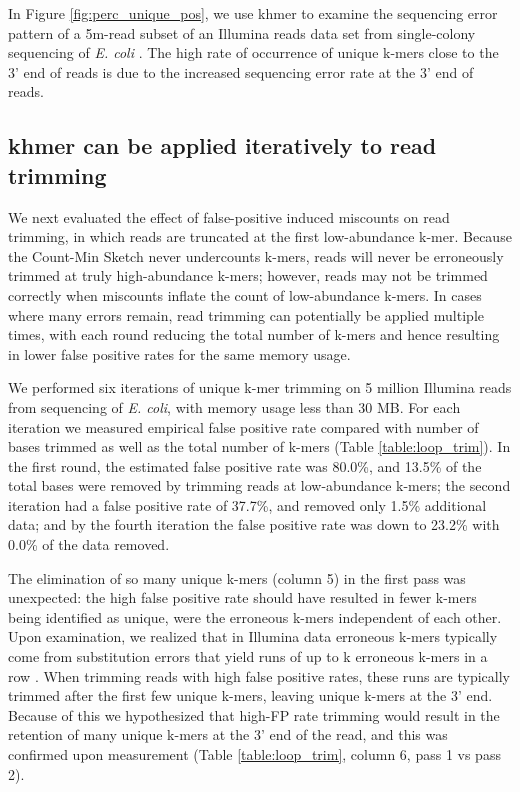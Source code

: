 \documentclass[10pt]{article}
\begin{document}
In Figure \ref{fig:perc_unique_pos}, we use khmer to examine the
sequencing error pattern of a 5m-read subset of an Illumina reads data
set from single-colony sequencing of {\em E. coli}
\cite{pubmed21926975}.  The high rate of occurrence of unique k-mers
close to the 3' end of reads is due to the increased sequencing error
rate at the 3' end of reads.

\subsection*{khmer can be applied iteratively to read trimming}

We next evaluated the effect of false-positive induced miscounts on
read trimming, in which reads are truncated at the first low-abundance
k-mer.  Because the Count-Min Sketch never undercounts k-mers, reads
will never be erroneously trimmed at truly high-abundance k-mers;
however, reads may not be trimmed correctly when miscounts inflate the
count of low-abundance k-mers.  In cases where many errors remain,
read trimming can potentially be applied multiple times, with each
round reducing the total number of k-mers and hence resulting in lower
false positive rates for the same memory usage.

We performed six iterations of unique k-mer trimming on 5 million
Illumina reads from sequencing of {\em E. coli}, with memory
usage less than 30 MB.  For each iteration we measured empirical false
positive rate compared with number of bases trimmed as well as the
total number of k-mers (Table \ref{table:loop_trim}).  In the first
round, the estimated false positive rate was 80.0\%, and 13.5\% of the
total bases were removed by trimming reads at low-abundance k-mers;
the second iteration had a false positive rate of 37.7\%, and removed
only 1.5\% additional data; and by the fourth iteration the false
positive rate was down to 23.2\% with 0.0\% of the data removed.

The elimination of so many unique k-mers (column 5) in the first pass
was unexpected: the high false positive rate should have resulted in
fewer k-mers being identified as unique, were the erroneous
k-mers independent of each other. Upon examination, we realized that
in Illumina data erroneous k-mers typically come from substitution
errors that yield runs of up to k erroneous k-mers in a row
\cite{Kelley2010}.  When trimming reads with high false positive
rates, these runs are typically trimmed after the first few unique
k-mers, leaving unique k-mers at the 3' end.  Because of this we
hypothesized that high-FP rate trimming would result in the retention
of many unique k-mers at the 3' end of the read, and this was
confirmed upon measurement (Table \ref{table:loop_trim}, column 6,
pass 1 vs pass 2).
\end{document}
